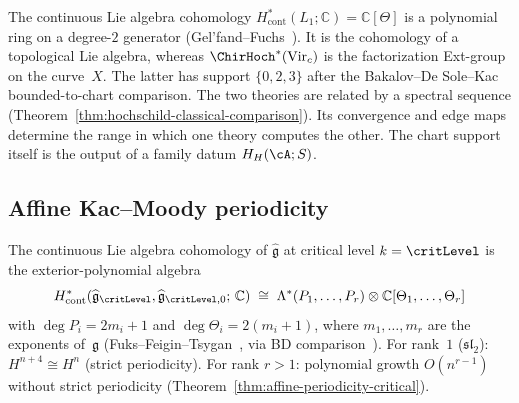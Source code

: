\begin{remark}
\label{rem:gf-vs-chirhoch}
The continuous Lie algebra cohomology
$H^*_{\mathrm{cont}}(L_1; \mathbb{C}) = \mathbb{C}[\Theta]$ is a
polynomial ring on a degree-$2$ generator
(Gel'fand--Fuchs~\cite{Fuks86}).  It is the cohomology of a
topological Lie algebra, whereas
$\ChirHoch^*(\mathrm{Vir}_c)$ is the factorization Ext-group on the
curve~$X$.  The latter has support $\{0,2,3\}$ after the
Bakalov--De Sole--Kac bounded-to-chart comparison.  The two theories
are related by a
spectral sequence
(Theorem~\ref{thm:hochschild-classical-comparison}).  Its convergence
and edge maps determine the range in which one theory computes the
other.  The chart support itself is the output of a family datum
$H_H(\cA;S)$.
\end{remark}

\subsection{Affine Kac--Moody periodicity}

\begin{theorem}\label{thm:critical-level-cohomology}
The continuous Lie algebra cohomology of $\widehat{\mathfrak{g}}$ at critical level $k = \critLevel$ is the exterior-polynomial algebra
\[H^*_{\mathrm{cont}}(\widehat{\mathfrak{g}}_{\critLevel},
\widehat{\mathfrak{g}}_{\critLevel,0};\, \mathbb{C})
\;\cong\; \Lambda^*(P_1,\ldots,P_r) \otimes \mathbb{C}[\Theta_1,\ldots,\Theta_r]\]
with $\deg P_i = 2m_i + 1$ and $\deg \Theta_i = 2(m_i+1)$, where $m_1,\ldots,m_r$ are the exponents of~$\mathfrak{g}$ (Fuks--Feigin--Tsygan~\cite{FT87}, via BD comparison~\cite{BD04}). For rank~$1$ ($\mathfrak{sl}_2$): $H^{n+4} \cong H^n$ (strict periodicity). For rank $r > 1$: polynomial growth $O(n^{r-1})$ without strict periodicity (Theorem~\ref{thm:affine-periodicity-critical}).
\end{theorem}

